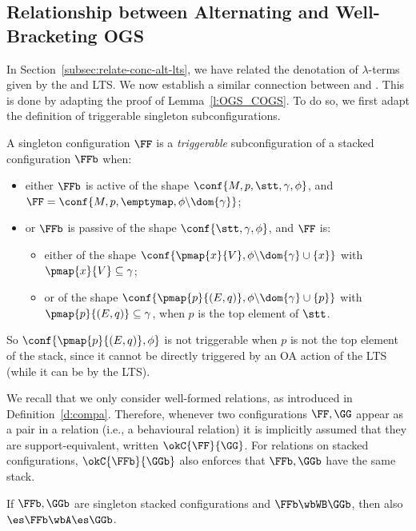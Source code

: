 \subsection{Relationship between Alternating and Well-Bracketing OGS}
\label{subsec:relate-alt-wb-lts}

In Section~\ref{subsec:relate-conc-alt-lts},
we have related the denotation of $\lambda$-terms
given by the \COGS and \AOGS LTS.
We now establish a similar connection
between \AOGS and \WBOGS.
This is done by adapting the proof of Lemma~\ref{l:OGS_COGS}.
To do so, we first adapt the definition of
triggerable singleton subconfigurations.

\begin{definition}
A singleton \AOGS configuration $\FF$ is 
a \emph{triggerable} subconfiguration of a stacked configuration $\FFb$ when:
\begin{itemize}
  \item either $\FFb$ is active of the shape
  $\conf{M,p,\stt,\gamma,\phi}$,
  and $\FF = \conf{M,p,\emptymap,\phi \backslash{\dom{\gamma}}}$;
  \item or $\FFb$ is passive of the shape
  $\conf{\stt,\gamma,\phi}$,
  and $\FF$ is:
  \begin{itemize}
    \item either of the shape
    $\conf{\pmap{x}{V},\phi \backslash{\dom{\gamma}} \cup\{x\}}$
    with $\pmap{x}{V} \subseteq \gamma$;
    \item or of the shape $\conf{\pmap{p}{(E,q)},\phi \backslash{\dom{\gamma}} \cup\{p\}}$
    with $\pmap{p}{(E,q)} \subseteq \gamma$,
    when $p$ is the top element of $\stt$.
  \end{itemize}
\end{itemize}
\end{definition}
\noindent
So
$\conf{\pmap{p}{(E,q)},\phi}$ is not triggerable 
when $p$ is not the top element of the stack,
since it cannot be directly triggered by an OA action of the \WBOGS LTS
(while it can be by the \AOGS LTS).

We recall that we only consider well-formed relations, 
as introduced in Definition~\ref{d:compa}.
Therefore, whenever two configurations $\FF,\GG$ appear as
a pair in a relation (i.e., a behavioural relation) 
it is implicitly assumed that they are support-equivalent, written
$\okC{\FF}{\GG}$.
For relations on stacked configurations, $\okC{\FFb}{\GGb}$ 
also enforces that $\FFb,\GGb$ have the same stack.

\begin{lemma}
\label{l:AOGS_WBOGS}
If $\FFb, \GGb$ are singleton stacked configurations and 
$\FFb \wbWB \GGb$, then also $\es\FFb \wbA \es\GGb$. 
\end{lemma}

